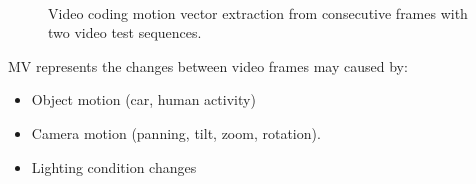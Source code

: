 \begin{figure}
\centering
{}
\\
\caption{Video coding motion vector extraction from consecutive frames with two video test sequences.}
\label{fig:mvextract}
\end{figure}
MV represents the changes between video frames may caused by:
\begin{itemize}
\item Object motion (car, human activity)
\item Camera motion (panning, tilt, zoom, rotation).
\item Lighting condition changes
\end{itemize}

